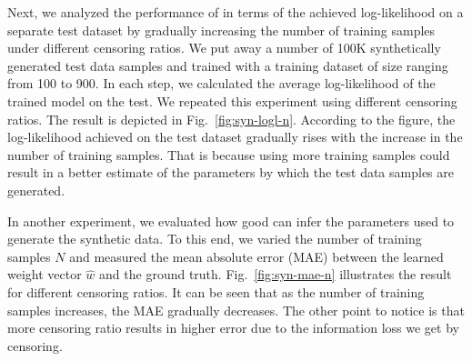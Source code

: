 Next, we analyzed the performance of \npglm in terms of the achieved log-likelihood on a separate test dataset by gradually increasing the number of training samples under different censoring ratios. We put away a number of 100K synthetically generated test data samples and trained \npglm with a training dataset of size ranging from 100 to 900. In each step, we calculated the average log-likelihood of the trained model on the test. We repeated this experiment using different censoring ratios. The result is depicted in Fig.~\ref{fig:syn-logl-n}. According to the figure, the log-likelihood achieved on the test dataset gradually rises with the increase in the number of training samples. That is because using more training samples could result in a better estimate of the parameters by which the test data samples are generated.

In another experiment, we evaluated how good \npglm can infer the parameters used to generate the synthetic data. To this end, we varied the number of training samples $N$ and measured the mean absolute error (MAE) between the learned weight vector $\hat{w}$ and the ground truth. Fig.~\ref{fig:syn-mae-n} illustrates the result for different censoring ratios. It can be seen that as the number of training samples increases, the MAE gradually decreases. The other point to notice is that more censoring ratio results in higher error due to the information loss we get by censoring.

